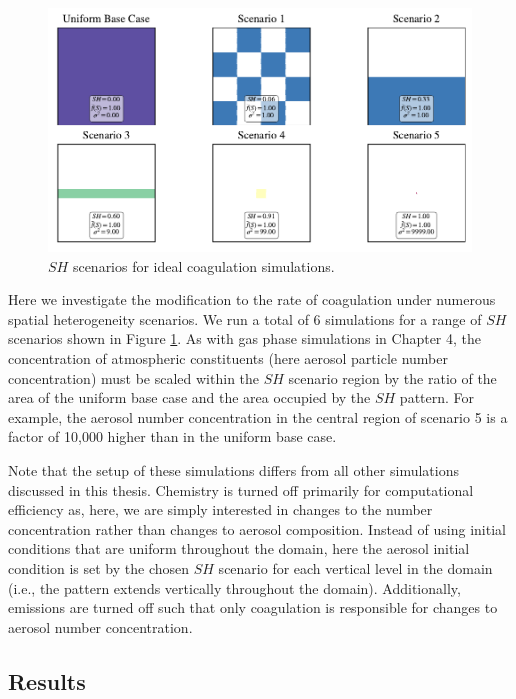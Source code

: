 \begin{figure}[h]
  \centering
    \includegraphics[width=\textwidth]{figures/chapter5/ideal-coag/ideal-coag-SH-scenarios.pdf}
    \caption{$SH$ scenarios for ideal coagulation simulations.}
    \label{fig:sh-scenarios-ideal-coag}
\end{figure}

Here we investigate the modification to the rate of coagulation under numerous spatial heterogeneity scenarios. We run a total of 6 simulations for a range of $SH$ scenarios shown in Figure \ref{fig:sh-scenarios-ideal-coag}. As with gas phase simulations in Chapter 4, the concentration of atmospheric constituents (here aerosol particle number concentration) must be scaled within the $SH$ scenario region by the ratio of the area of the uniform base case and the area occupied by the $SH$ pattern. For example, the aerosol number concentration in the central region of scenario 5 is a factor of 10,000 higher than in the uniform base case. 

Note that the setup of these simulations differs from all other simulations discussed in this thesis. Chemistry is turned off primarily for computational efficiency as, here, we are simply interested in changes to the number concentration rather than changes to aerosol composition. Instead of using initial conditions that are uniform throughout the domain, here the aerosol initial condition is set by the chosen $SH$ scenario for each vertical level in the domain (i.e., the pattern extends vertically throughout the domain). Additionally, emissions are turned off such that only coagulation is responsible for changes to aerosol number concentration.

\subsection{Results}\label{ideal-coag-results}

